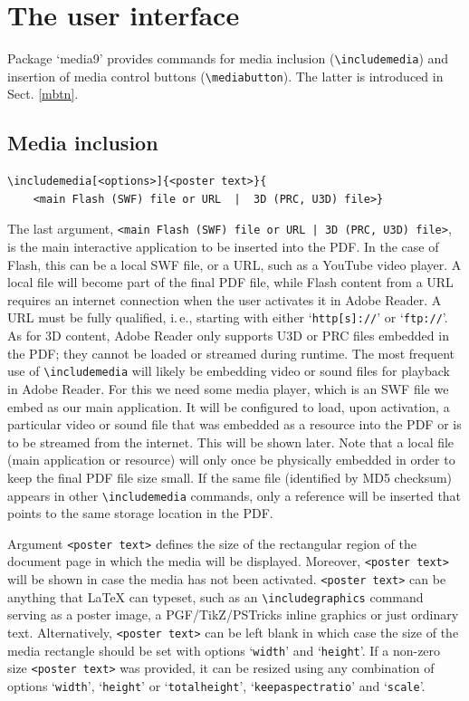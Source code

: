 \documentclass[a4paper]{article}
\begin{document}
\section{The user interface}
Package `media9' provides commands for media inclusion (\verb+\includemedia+) and insertion of media control buttons (\verb+\mediabutton+). The latter is introduced in Sect. \ref{mbtn}.

\subsection{Media inclusion}
\begin{verbatim}
\includemedia[<options>]{<poster text>}{
    <main Flash (SWF) file or URL  |  3D (PRC, U3D) file>}
\end{verbatim}

The last argument, \verb+<main Flash (SWF) file or URL | 3D (PRC, U3D) file>+, is the main interactive application to be inserted into the PDF. In the case of Flash, this can be a local SWF file, or a URL, such as a YouTube video player. A local file will become part of the final PDF file, while Flash content from a URL requires an internet connection when the user activates it in Adobe Reader. A URL must be fully qualified, i.\,e., starting with either `\verb+http[s]://+' or `\verb+ftp://+'. As for 3D content, Adobe Reader only supports U3D or PRC files embedded in the PDF; they cannot be loaded or streamed during runtime. The most frequent use of \verb+\includemedia+ will likely be embedding video or sound files for playback in Adobe Reader. For this we need some media player, which is an SWF file we embed as our main application. It will be configured to load, upon activation, a particular video or sound file that was embedded as a resource into the PDF or is to be streamed from the internet. This will be shown later. Note that a local file (main application or resource) will only once be physically embedded in order to keep the final PDF file size small. If the same file (identified by MD5 checksum) appears in other \verb+\includemedia+ commands, only a reference will be inserted that points to the same storage location in the PDF.

Argument \verb+<poster text>+ defines the size of the rectangular region of the document page in which the media will be displayed. Moreover, \verb+<poster text>+ will be shown in case the media has not been activated.
\verb+<poster text>+ can be anything that \LaTeX{} can typeset, such as an \verb+\includegraphics+ command serving as a poster image, a PGF/TikZ/PSTricks inline graphics or just ordinary text. Alternatively, \verb+<poster text>+ can be left blank in which case the size of the media rectangle should be set with options `\verb+width+' and `\verb+height+'. If a non-zero size \verb+<poster text>+ was provided, it can be resized using any combination of options `\verb+width+', `\verb+height+' or `\verb+totalheight+', `\verb+keepaspectratio+' and `\verb+scale+'.
\end{document}
